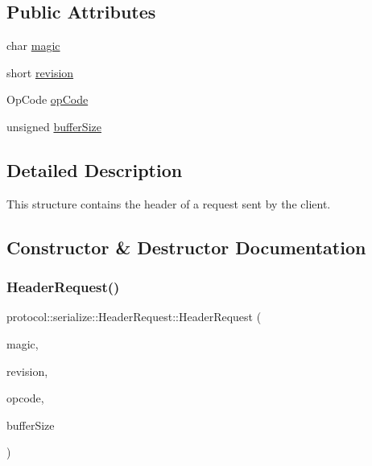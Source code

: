 \subsection*{Public Attributes}
\begin{DoxyCompactItemize}
\item 
char \hyperlink{structprotocol_1_1serialize_1_1_header_request_ab7c26d951ffb1bbac4622ac5a9f9dbc1}{magic}
\item 
short \hyperlink{structprotocol_1_1serialize_1_1_header_request_a9b10c7ac55252322b71c9720854d8d5a}{revision}
\item 
Op\+Code \hyperlink{structprotocol_1_1serialize_1_1_header_request_a285c64b3712f2116e17eba412c03c986}{op\+Code}
\item 
unsigned \hyperlink{structprotocol_1_1serialize_1_1_header_request_a60ceae16d905c732b6b307d09012f935}{buffer\+Size}
\end{DoxyCompactItemize}


\subsection{Detailed Description}
This structure contains the header of a request sent by the client. 

\subsection{Constructor \& Destructor Documentation}
\mbox{\label{structprotocol_1_1serialize_1_1_header_request_a3dfea4cb729e593117ce9f8d5a851ef6}} 
\subsubsection{\texorpdfstring{Header\+Request()}{HeaderRequest()}\hspace{0.1cm}{\footnotesize\ttfamily [1/2]}}
{\footnotesize\ttfamily protocol\+::serialize\+::\+Header\+Request\+::\+Header\+Request (\begin{DoxyParamCaption}\item[{char}]{magic,  }\item[{short}]{revision,  }\item[{Op\+Code}]{opcode,  }\item[{unsigned}]{buffer\+Size }\end{DoxyParamCaption})}



